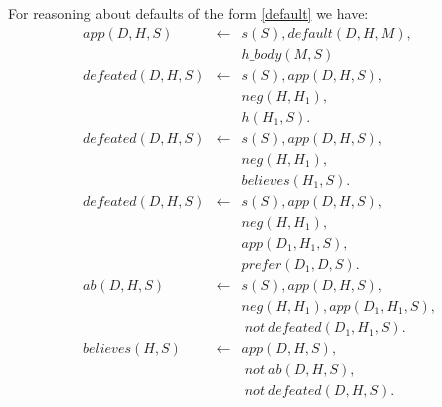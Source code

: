 \documentclass{article}
\def\naf{\: {not} \:}
\begin{document}
 For reasoning about defaults  of the form \eqref{default} we have:
% 
\begin{eqnarray}
app(D, H, S) & \leftarrow  &  s(S), default(D, H, M), \nonumber \\
&& h\_body(M,S)  \label{lp:app} \\ 
defeated(D, H, S) & \leftarrow  & s(S), app(D, H, S), \nonumber\\
        & &  neg(H,H_1), \nonumber \\
        & &  h(H_1, S).  \:\:\:  \label{lp:defeat01} \\ 
defeated(D, H, S) & \leftarrow  & s(S), app(D, H, S), \nonumber\\
        & &  neg(H,H_1), \nonumber \\
        & &  believes(H_1, S).  \:\:\:  \label{lp:defeat0} \\ 
defeated(D, H, S) & \leftarrow  & s(S),  app(D, H, S),    \nonumber \\ 
        & &  neg(H,H_1), \nonumber \\ %
        & & app(D_1, H_1, S), \nonumber\\
        & & prefer(D_1, D, S).   \label{lp:defeat}\\ 
ab(D, H, S)& \leftarrow &   s(S), app(D, H, S), \nonumber\\
    & &  neg(H, H_1), app(D_1, H_1, S),  \nonumber \\
    &&   \naf defeated(D_1, H_1, S).  \label{lp:ab}     \\
believes(H, S) & \leftarrow & app(D, H, S), \nonumber \\
        & & \naf ab(D, H, S), \nonumber\\
        & & \naf defeated(D, H, S).  \label{lp:holds}
%    
\end{eqnarray} 
\end{document}
